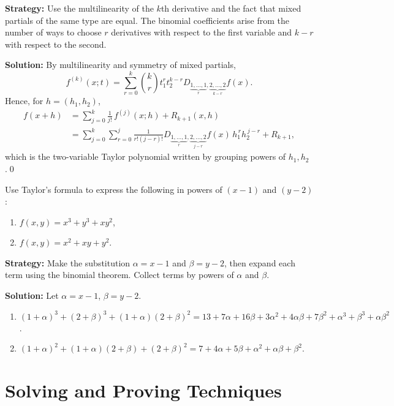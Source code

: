 \noindent\textbf{Strategy:} Use the multilinearity of the \( k \)th derivative and the fact that mixed partials of the same type are equal. The binomial coefficients arise from the number of ways to choose \( r \) derivatives with respect to the first variable and \( k-r \) with respect to the second.

\bigskip\noindent\textbf{Solution:}
By multilinearity and symmetry of mixed partials,
\[f^{(k)}(x;t)=\sum_{r=0}^k \binom{k}{r} t_1^r t_2^{k-r} D_{\underbrace{1,\dots,1}_{r},\underbrace{2,\dots,2}_{k-r}} f(x).\]
Hence, for $h=(h_1,h_2)$,
\begin{align*}
f(x+h)&=\sum_{j=0}^k \frac{1}{j!}\,f^{(j)}(x;h)+R_{k+1}(x,h)\\
&=\sum_{j=0}^k\sum_{r=0}^j \frac{1}{r!(j-r)!} D_{\!\underbrace{1,\dots,1}_{r},\underbrace{2,\dots,2}_{j-r}} f(x)\,h_1^{\,r} h_2^{\,j-r}+R_{k+1},
\end{align*}
which is the two-variable Taylor polynomial written by grouping powers of $h_1,h_2$.\qed


\begin{problembox}
\begin{problemstatement}
Use Taylor's formula to express the following in powers of \( (x - 1) \) and \( (y - 2) \):
\begin{enumerate}[label=(\alph*)]
\item \( f(x, y) = x^3 + y^3 + xy^2 \),
\item \( f(x, y) = x^2 + xy + y^2 \).
\end{enumerate}
\end{problemstatement}
\end{problembox}

\noindent\textbf{Strategy:} Make the substitution \( \alpha = x - 1 \) and \( \beta = y - 2 \), then expand each term using the binomial theorem. Collect terms by powers of \( \alpha \) and \( \beta \).

\bigskip\noindent\textbf{Solution:}
Let $\alpha=x-1$, $\beta=y-2$.
\begin{enumerate}[label=(\alph*)]
\item $(1+\alpha)^3+(2+\beta)^3+(1+\alpha)(2+\beta)^2=13+7\alpha+16\beta+3\alpha^2+4\alpha\beta+7\beta^2+\alpha^3+\beta^3+\alpha\beta^2$.
\item $(1+\alpha)^2+(1+\alpha)(2+\beta)+(2+\beta)^2=7+4\alpha+5\beta+\alpha^2+\alpha\beta+\beta^2$.
\end{enumerate}

\section{Solving and Proving Techniques}

